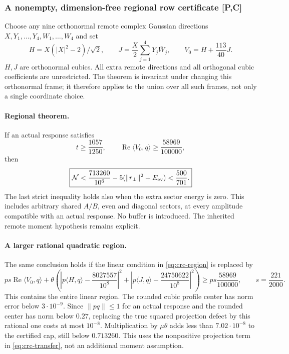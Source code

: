\subsubsection{A nonempty, dimension-free regional row certificate [P,C]}
Choose any nine orthonormal remote complex Gaussian directions
$X,Y_1,\ldots,Y_4,W_1,\ldots,W_4$ and set
\[
 H=X(|X|^2-2)/\sqrt2,\qquad
 J=\frac X2\sum_{j=1}^4Y_j\bar W_j,\qquad
 V_0=H+\frac{113}{40}J.
\]
$H,J$ are orthonormal cubics. All extra remote directions and all
orthogonal cubic coefficients are unrestricted. The theorem is invariant
under changing this orthonormal frame; it therefore applies to the union
over all such frames, not only a single coordinate choice.

\paragraph{Regional theorem.}
If an actual response satisfies
\begin{equation}\label{eq:crc-region}
 t\ge\frac{1057}{1250},\qquad
 \operatorname{Re}\langle V_0,q\rangle\ge\frac{58969}{100000},
\end{equation}
then
\begin{equation}\label{eq:crc-cap}
 \boxed{\mathcal N<\frac{713260}{10^6}
       -5(\|r_\perp\|^2+E_{\rm ev})<\frac{500}{701}.}
\end{equation}
The last strict inequality holds also when the extra sector energy is zero.
This includes arbitrary shared $A/B$, even and diagonal sectors, at every
amplitude compatible with an actual response. No buffer is introduced.
The inherited remote moment hypothesis remains explicit.

\paragraph{A larger rational quadratic region.}
The same conclusion holds if the linear condition in
\eqref{eq:crc-region} is replaced by
\begin{equation}\label{eq:crc-quadratic-region}
 p s\operatorname{Re}\langle V_0,q\rangle
 +\theta\left(\left|p\langle H,q\rangle-\frac{8027557}{10^8}\right|^2
             +\left|p\langle J,q\rangle-\frac{24750622}{10^8}\right|^2\right)
 \ge p s\frac{58969}{100000},\qquad s=\frac{221}{2000}.
\end{equation}
This contains the entire linear region. The rounded cubic profile center
has norm error below $3\cdot10^{-9}$. Since $\|pq\|\le1$ for an actual
response and the rounded center has norm below $0.27$, replacing the
true squared projection defect by this rational one costs at most
$10^{-8}$. Multiplication by $\mu\theta$ adds less than
$7.02\cdot10^{-8}$ to the certified cap, still below $0.713260$.
This uses the nonpositive projection term in \eqref{eq:crc-transfer},
not an additional moment assumption.

